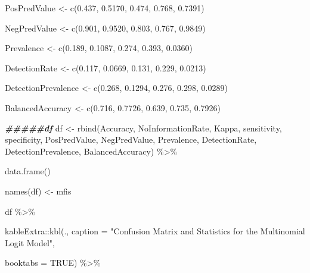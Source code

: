 \documentclass[a4paper,nobind]{templates/ociamthesis}
\newenvironment{Shaded}{\begin{snugshade}}{\end{snugshade}}
\newcommand{\AttributeTok}[1]{\textcolor[rgb]{0.77,0.63,0.00}{#1}}
\newcommand{\ConstantTok}[1]{\textcolor[rgb]{0.00,0.00,0.00}{#1}}
\newcommand{\DocumentationTok}[1]{\textcolor[rgb]{0.56,0.35,0.01}{\textbf{\textit{#1}}}}
\newcommand{\FloatTok}[1]{\textcolor[rgb]{0.00,0.00,0.81}{#1}}
\newcommand{\FunctionTok}[1]{\textcolor[rgb]{0.00,0.00,0.00}{#1}}
\newcommand{\NormalTok}[1]{#1}
\newcommand{\OtherTok}[1]{\textcolor[rgb]{0.56,0.35,0.01}{#1}}
\newcommand{\SpecialCharTok}[1]{\textcolor[rgb]{0.00,0.00,0.00}{#1}}
\newcommand{\StringTok}[1]{\textcolor[rgb]{0.31,0.60,0.02}{#1}}
\renewenvironment{Shaded}
{
  \vspace{10pt}%
  \begin{snugshade}%
}{%
  \end{snugshade}%
  \vspace{8pt}%
}
\begin{document}
\begin{Shaded}
\begin{Highlighting}[]
\NormalTok{PosPredValue }\OtherTok{\textless{}{-}} \FunctionTok{c}\NormalTok{(}\FloatTok{0.437}\NormalTok{, }\FloatTok{0.5170}\NormalTok{, }\FloatTok{0.474}\NormalTok{, }\FloatTok{0.768}\NormalTok{, }\FloatTok{0.7391}\NormalTok{)}

\NormalTok{NegPredValue }\OtherTok{\textless{}{-}} \FunctionTok{c}\NormalTok{(}\FloatTok{0.901}\NormalTok{, }\FloatTok{0.9520}\NormalTok{, }\FloatTok{0.803}\NormalTok{, }\FloatTok{0.767}\NormalTok{, }\FloatTok{0.9849}\NormalTok{)}

\NormalTok{Prevalence }\OtherTok{\textless{}{-}} \FunctionTok{c}\NormalTok{(}\FloatTok{0.189}\NormalTok{, }\FloatTok{0.1087}\NormalTok{, }\FloatTok{0.274}\NormalTok{, }\FloatTok{0.393}\NormalTok{, }\FloatTok{0.0360}\NormalTok{)}

\NormalTok{DetectionRate }\OtherTok{\textless{}{-}} \FunctionTok{c}\NormalTok{(}\FloatTok{0.117}\NormalTok{, }\FloatTok{0.0669}\NormalTok{, }\FloatTok{0.131}\NormalTok{, }\FloatTok{0.229}\NormalTok{, }\FloatTok{0.0213}\NormalTok{)}

\NormalTok{DetectionPrevalence }\OtherTok{\textless{}{-}} \FunctionTok{c}\NormalTok{(}\FloatTok{0.268}\NormalTok{, }\FloatTok{0.1294}\NormalTok{, }\FloatTok{0.276}\NormalTok{, }\FloatTok{0.298}\NormalTok{, }\FloatTok{0.0289}\NormalTok{)}

\NormalTok{BalancedAccuracy }\OtherTok{\textless{}{-}} \FunctionTok{c}\NormalTok{(}\FloatTok{0.716}\NormalTok{, }\FloatTok{0.7726}\NormalTok{, }\FloatTok{0.639}\NormalTok{, }\FloatTok{0.735}\NormalTok{, }\FloatTok{0.7926}\NormalTok{)}
 
\DocumentationTok{\#\#\#\#\#df}
\NormalTok{df }\OtherTok{\textless{}{-}} \FunctionTok{rbind}\NormalTok{(Accuracy, NoInformationRate, Kappa, sensitivity, specificity, PosPredValue, NegPredValue, Prevalence, DetectionRate, DetectionPrevalence, BalancedAccuracy) }\SpecialCharTok{\%\textgreater{}\%} 
  
  \FunctionTok{data.frame}\NormalTok{()}

\FunctionTok{names}\NormalTok{(df) }\OtherTok{\textless{}{-}}\NormalTok{ mfis}

\NormalTok{df }\SpecialCharTok{\%\textgreater{}\%} 
  
\NormalTok{  kableExtra}\SpecialCharTok{::}\FunctionTok{kbl}\NormalTok{(., }\AttributeTok{caption =} \StringTok{"Confusion Matrix and Statistics for the Multinomial Logit Model"}\NormalTok{, }
      
  \AttributeTok{booktabs =} \ConstantTok{TRUE}\NormalTok{) }\SpecialCharTok{\%\textgreater{}\%} 
  

\end{Highlighting}
\end{Shaded}
\end{document}
